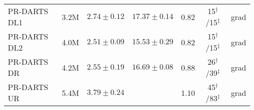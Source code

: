 \documentclass[conference]{IEEEtran}
\begin{document}
\begin{table*}[htbp]
\begin{center}
\begin{tabular}{ l  c c c  c c c }
			\midrule
			PR-DARTS DL1					& 3.2M & $2.74 \pm 0.12$ & $17.37 \pm 0.14$  & 0.82 & 15$^\dagger$/15$^\ddagger$ & grad \\
			PR-DARTS DL2					& 4.0M & $2.51 \pm 0.09$ & $15.53 \pm 0.29$  & 0.82 & 15$^\dagger$/15$^\ddagger$ & grad \\
			PR-DARTS DR					& 4.2M & $2.55 \pm 0.19$ & $16.69 \pm 0.08$  & 0.88 & 26$^\dagger$/39$^\ddagger$ & grad \\
			PR-DARTS UR					& 5.4M & $3.79 \pm 0.24$ &  & 1.10 & 45$^\dagger$/83$^\ddagger$ & grad \\
			\bottomrule
		\end{tabular}
		\label{tab_results}
	\end{center}
\end{table*}
\end{document}
